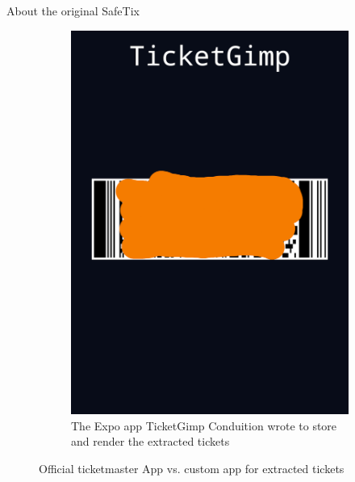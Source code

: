 \documentclass[final,dvipsnames]{beamer}
\newlength{\colwidth}
\begin{document}
\begin{frame}[t, fragile]
\begin{columns}[t]
\begin{column}{\colwidth}
\begin{block}{About the original SafeTix}
\begin{figure}[htbp]
\begin{subfigure}[t]{0.45\textwidth}
                \label{fig:app_barcode}
            \end{subfigure}
            \begin{subfigure}[t]{0.45\textwidth}
                \includegraphics[width=\textwidth]{../figures/Conduition_custom_ticket_app.png}
                \caption{The Expo app TicketGimp Conduition wrote to store and render the extracted tickets \cite{reverse_engineering_ticketmaster}}
                \label{fig:conduition_custom_app}
            \end{subfigure}
            \caption{Official ticketmaster App vs. custom app for extracted tickets}
        \end{figure}
    \end{block}


\end{column}
\end{columns}
\end{frame}
\end{document}
